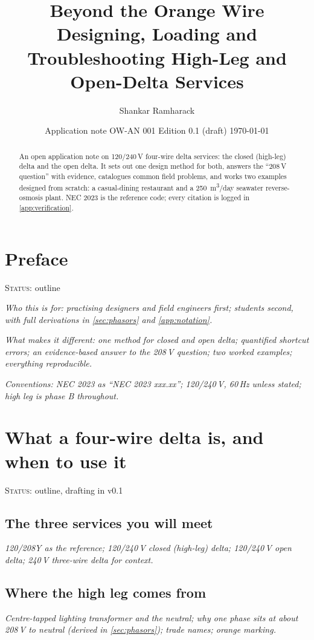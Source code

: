 \documentclass[11pt,a4paper]{article}
\title{Beyond the Orange Wire\\[4pt]
  \large Designing, Loading and Troubleshooting High-Leg and Open-Delta Services}
\author{Shankar Ramharack}
\date{Application note OW-AN 001 \quad Edition 0.1 (draft) \quad \today}
\newcommand{\plan}[1]{\par{\small\color{gray}\itshape #1}\par}
\newcommand{\status}[1]{{\small\color{orange!80!black}\textsc{Status:} #1}\par\medskip}
\begin{document}
\maketitle

\begin{abstract}
An open application note on 120/240\,V four-wire delta services: the closed (high-leg) delta and the open delta. It sets out one design method for both, answers the ``208\,V question'' with evidence, catalogues common field problems, and works two examples designed from scratch: a casual-dining restaurant and a \SI{250}{m^3/day} seawater reverse-osmosis plant. NEC 2023 is the reference code; every citation is logged in \cref{app:verification}.
\end{abstract}

\tableofcontents
\clearpage

\section*{Preface}
\status{outline}
\plan{Who this is for: practising designers and field engineers first; students second, with full derivations in \cref{sec:phasors} and \cref{app:notation}.}
\plan{What makes it different: one method for closed and open delta; quantified shortcut errors; an evidence-based answer to the 208\,V question; two worked examples; everything reproducible.}
\plan{Conventions: NEC 2023 \citep{nfpa70_2023} as ``NEC 2023 xxx.xx''; 120/240\,V, 60\,Hz unless stated; high leg is phase B throughout.}

\section{What a four-wire delta is, and when to use it}\label{sec:what-when}
\status{outline, drafting in v0.1}

\subsection{The three services you will meet}
\plan{120/208Y as the reference; 120/240\,V closed (high-leg) delta; 120/240\,V open delta; 240\,V three-wire delta for context.}
\subsection{Where the high leg comes from}
\plan{Centre-tapped lighting transformer and the neutral; why one phase sits at about 208\,V to neutral (derived in \cref{sec:phasors}); trade names; orange marking.}
\end{document}
